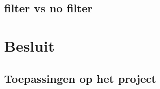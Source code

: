 \documentclass[a4paper,11pt]{article}
\begin{document}
	\subsection{filter vs no filter} %
	

\section{Besluit}\label{sec:besluit}
	
	
	\subsection{Toepassingen op het project}\label{subsec:toepassingen}
		

%
%
\end{document}
